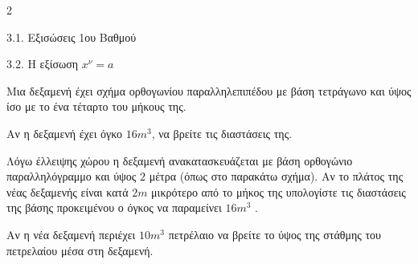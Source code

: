 \begin{ylh}{2}
    \item 3.1. Εξισώσεις 1ου Βαθμού
    \item 3.2. Η εξίσωση $x^{\nu}=a$
\end{ylh}

Μια δεξαμενή έχει σχήμα ορθογωνίου παραλληλεπιπέδου με βάση τετράγωνο και ύψος ίσο με το ένα τέταρτο του μήκους της.
\begin{alist}
\item Αν η δεξαμενή έχει όγκο $16m^3$, να βρείτε τις διαστάσεις της.

\item Λόγω έλλειψης χώρου η δεξαμενή ανακατασκευάζεται με βάση ορθογώνιο παραλληλόγραμμο και ύψος $2$ μέτρα (όπως στο παρακάτω σχήμα). Αν το πλάτος της νέας δεξαμενής είναι κατά $2m$ μικρότερο από το μήκος της υπολογίστε τις διαστάσεις της βάσης προκειμένου ο όγκος να παραμείνει $16m^3$ .

\begin{center}
\end{center}
\item Αν η νέα δεξαμενή περιέχει $10m^3$ πετρέλαιο να βρείτε το ύψος της στάθμης του πετρελαίου μέσα στη δεξαμενή.

\end{alist}

